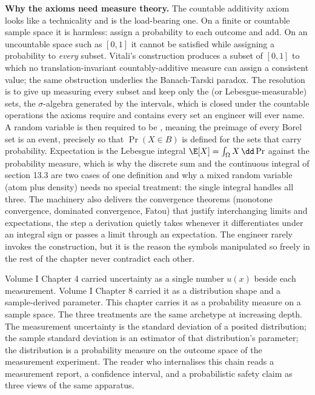 \begin{mastery}
\textbf{Why the axioms need measure theory.} The countable additivity
axiom looks like a technicality and is the load-bearing one. On a finite
or countable sample space it is harmless: assign a probability to each
outcome and add. On an uncountable space such as $[0, 1]$ it cannot be
satisfied while assigning a probability to \emph{every} subset. Vitali's
construction produces a subset of $[0, 1]$ to which no
translation-invariant countably-additive measure can assign a
consistent value; the same obstruction underlies the Banach-Tarski
paradox. The resolution is to give up measuring every subset and keep
only the  (or Lebesgue-measurable) sets, the
$\sigma$-algebra generated by the intervals, which is closed under the
countable operations the axioms require and contains every set an
engineer will ever name. A random variable is then required to be
, meaning the preimage of every Borel set is an
event, precisely so that $\Pr(X \in B)$ is defined for the sets that
carry probability. Expectation is the Lebesgue integral $\E[X] = \int_{\Omega}
X \,\dd\Pr$ against the probability measure, which is why the discrete sum
and the continuous integral of section 13.3 are two cases of one
definition and why a mixed random variable (atom plus density) needs no
special treatment: the single integral handles all three. The machinery
also delivers the convergence theorems (monotone convergence, dominated
convergence, Fatou) that justify interchanging limits and expectations,
the step a derivation quietly takes whenever it differentiates under an
integral sign or passes a limit through an expectation. The engineer
rarely invokes the construction, but it is the reason the symbols
manipulated so freely in the rest of the chapter never contradict each
other.
\end{mastery}

\begin{archetype}
Volume I Chapter 4 carried uncertainty as a single number $u(x)$
beside each measurement. Volume I Chapter 8 carried it as a
distribution shape and a sample-derived parameter. This chapter
carries it as a probability measure on a sample space. The three
treatments are the same archetype at increasing depth. The
measurement uncertainty is the standard deviation of a posited
distribution; the sample standard deviation is an estimator of that
distribution's parameter; the distribution is a probability measure
on the outcome space of the measurement experiment. The reader who
internalises this chain reads a measurement report, a confidence
interval, and a probabilistic safety claim as three views of the
same apparatus.
\end{archetype}

